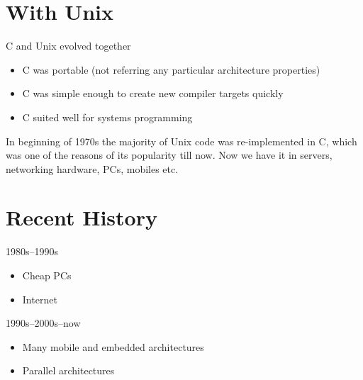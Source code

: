 \documentclass[xetex,aspectratio=169]{beamer}
\begin{document}
\section{With Unix}

\begin{frame}{C and Unix evolved together}
	\begin{itemize}
		\item C was portable (not referring any particular architecture properties)
		\item C was simple enough to create new compiler targets quickly
		\item C suited well for systems programming
	\end{itemize}

	\pause
	In beginning of 1970s the majority of Unix code was re-implemented in C, which was one of the reasons of its popularity till now. Now we have it in servers, networking hardware, PCs, mobiles etc.
\end{frame}

\section{Recent History}

\begin{frame}{1980s--1990s}
	\begin{itemize}
	\item Cheap PCs
	\item Internet
	\end{itemize}
\end{frame}

\begin{frame}{1990s--2000s--now}
	\begin{itemize}
		\item Many mobile and embedded architectures
		\item Parallel architectures
	\end{itemize}
\end{frame}

\postamble
\end{document}
